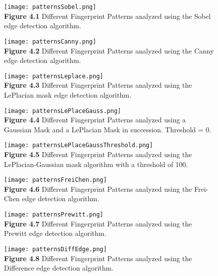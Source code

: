 \documentclass{article}%
\begin{document}
\newpage
\begin{figure}[h]
\centering
\texttt{[image: patternsSobel.png]}\\
{\bf Figure 4.1} Different Fingerprint Patterns analyzed using the Sobel edge detection algorithm.   
\end{figure}

\newpage
\begin{figure}[h]
\centering
\texttt{[image: patternsCanny.png]}\\
{\bf Figure 4.2} Different Fingerprint Patterns analyzed using the Canny edge detection algorithm.   
\end{figure}

\newpage
\begin{figure}[h]
\centering
\texttt{[image: patternsLeplace.png]}\\
{\bf Figure 4.3} Different Fingerprint Patterns analyzed using the LePlacian mask edge detection algorithm.  
\end{figure}

\newpage
\begin{figure}[h]
\centering
\texttt{[image: patternsLePlaceGauss.png]}\\
{\bf Figure 4.4} Different Fingerprint Patterns analyzed using a Gaussian Mask and a LePlacian Mask in succession. Threshold = 0.   
\end{figure}

\newpage
\begin{figure}[h]
\centering
\texttt{[image: patternsLePlaceGaussThreshold.png]}\\
{\bf Figure 4.5} Different Fingerprint Patterns analyzed using the LePlacian-Gaussian mask algorithm with a threshold of 100.  
\end{figure}

\newpage
\begin{figure}[h]
\centering
\texttt{[image: patternsFreiChen.png]}\\
{\bf Figure 4.6} Different Fingerprint Patterns analyzed using the Frei-Chen edge detection algorithm.  
\end{figure}

\newpage
\begin{figure}[h]
\centering
\texttt{[image: patternsPrewitt.png]}\\
{\bf Figure 4.7} Different Fingerprint Patterns analyzed using the Prewitt edge detection algorithm.  
\end{figure}

\newpage
\begin{figure}[h]
\centering
\texttt{[image: patternsDiffEdge.png]}\\
{\bf Figure 4.8} Different Fingerprint Patterns analyzed using the Difference edge detection algorithm.  
\end{figure}
\end{document}
